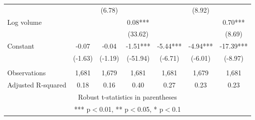 \documentclass[]{article}
\begin{document}
\begin{tabular}{lcccccc}
 &  & (6.78) &  &  & (8.92) &  \\
Log volume &  &  & 0.08*** &  &  & 0.70*** \\
 &  &  & (33.62) &  &  & (8.69) \\
Constant & -0.07 & -0.04 & -1.51*** & -5.44*** & -4.94*** & -17.39*** \\
 & (-1.63) & (-1.19) & (-51.94) & (-6.71) & (-6.01) & (-8.97) \\
 &  &  &  &  &  &  \\
Observations & 1,681 & 1,679 & 1,681 & 1,681 & 1,679 & 1,681 \\
 Adjusted R-squared & 0.18 & 0.16 & 0.40 & 0.27 & 0.23 & 0.23 \\ \hline
\multicolumn{7}{c}{ Robust t-statistics in parentheses} \\
\multicolumn{7}{c}{ *** p$<$0.01, ** p$<$0.05, * p$<$0.1} \\
\end{tabular}
\end{document}
